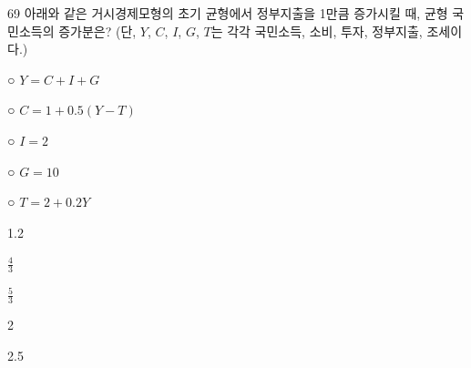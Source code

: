 \begin{question}{69}
아래와 같은 거시경제모형의 초기 균형에서 정부지출을 1만큼 증가시킬 때, 균형 국민소득의 증가분은? (단, $Y$, $C$, $I$, $G$, $T$는 각각 국민소득, 소비, 투자, 정부지출, 조세이다.)
\begin{framedtext}
○ $Y=C+I+G$ \par
○ $C=1+0.5(Y-T)$ \par
○ $I=2$ \par
○ $G=10$ \par
○ $T=2+0.2Y$ \par
\end{framedtext}
\begin{choices}
  \item 1.2
  \item $\frac{4}{3}$
  \item $\frac{5}{3}$
  \item 2
  \item 2.5
\end{choices}
\end{question}
